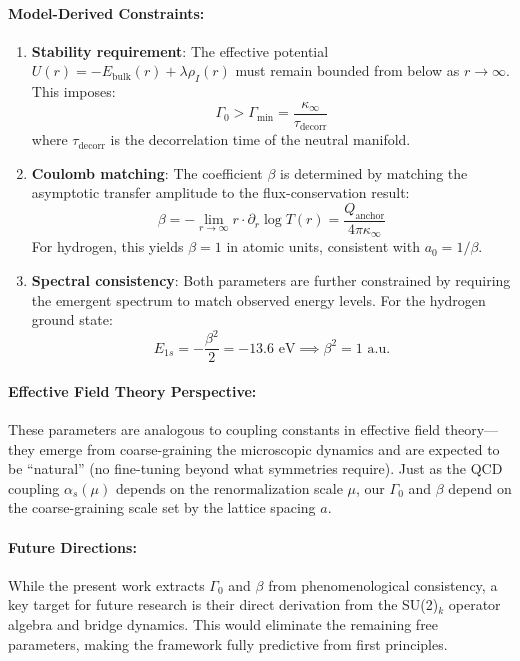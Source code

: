 \documentclass[11pt]{article}
\theoremstyle{plain}
\theoremstyle{definition}
\begin{document}
\paragraph{Model-Derived Constraints:}
\begin{enumerate}
  \item \textbf{Stability requirement}: The effective potential $U(r) = -E_{\text{bulk}}(r) + \lambda\rho_I(r)$ must remain bounded from below as $r \to \infty$. This imposes:
    \begin{equation}
      \Gamma_0 > \Gamma_{\text{min}} = \frac{\kappa_\infty}{\tau_{\text{decorr}}}
    \end{equation}
    where $\tau_{\text{decorr}}$ is the decorrelation time of the neutral manifold.

  \item \textbf{Coulomb matching}: The coefficient $\beta$ is determined by matching the asymptotic transfer amplitude to the flux-conservation result:
    \begin{equation}
      \beta = -\lim_{r\to\infty} r \cdot \partial_r \log T(r) = \frac{Q_{\text{anchor}}}{4\pi\kappa_\infty}
    \end{equation}
    For hydrogen, this yields $\beta = 1$ in atomic units, consistent with $a_0 = 1/\beta$.

  \item \textbf{Spectral consistency}: Both parameters are further constrained by requiring the emergent spectrum to match observed energy levels. For the hydrogen ground state:
    \begin{equation}
      E_{1s} = -\frac{\beta^2}{2} = -13.6 \text{ eV} \implies \beta^2 = 1 \text{ a.u.}
    \end{equation}
\end{enumerate}

\paragraph{Effective Field Theory Perspective:}
These parameters are analogous to coupling constants in effective field theory---they emerge from coarse-graining the microscopic dynamics and are expected to be ``natural'' (no fine-tuning beyond what symmetries require). Just as the QCD coupling $\alpha_s(\mu)$ depends on the renormalization scale $\mu$, our $\Gamma_0$ and $\beta$ depend on the coarse-graining scale set by the lattice spacing $a$.

\paragraph{Future Directions:}
While the present work extracts $\Gamma_0$ and $\beta$ from phenomenological consistency, a key target for future research is their direct derivation from the SU(2)$_k$ operator algebra and bridge dynamics. This would eliminate the remaining free parameters, making the framework fully predictive from first principles.
\end{document}
